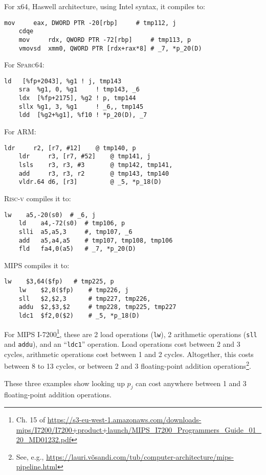 For x64, Haswell architecture, using Intel syntax, it compiles to:
\begin{lstlisting}[language={[x86]Assembler}]
    mov     eax, DWORD PTR -20[rbp]     # tmp112, j
    cdqe
    mov     rdx, QWORD PTR -72[rbp]     # tmp113, p
    vmovsd  xmm0, QWORD PTR [rdx+rax*8] # _7, *p_20(D)
\end{lstlisting}
For \textsc{Sparc64}:
\begin{lstlisting}[language={[sparc64]Assembler}]
    ld   [%fp+2043], %g1 ! j, tmp143
    sra  %g1, 0, %g1     ! tmp143, _6
    ldx  [%fp+2175], %g2 ! p, tmp144
    sllx %g1, 3, %g1     ! _6,, tmp145
    ldd  [%g2+%g1], %f10 ! *p_20(D), _7
\end{lstlisting}
For ARM:
\begin{lstlisting}[language={[ARM]Assembler}]
    ldr     r2, [r7, #12]    @ tmp140, p
    ldr     r3, [r7, #52]    @ tmp141, j
    lsls    r3, r3, #3       @ tmp142, tmp141,
    add     r3, r3, r2       @ tmp143, tmp140
    vldr.64 d6, [r3]         @ _5, *p_18(D)
\end{lstlisting}
\textsc{Risc-v} compiles it to:
\begin{lstlisting}[language={[RISC-V]Assembler}]
    lw    a5,-20(s0)  # _6, j
    ld    a4,-72(s0)  # tmp106, p
    slli  a5,a5,3     #, tmp107, _6
    add   a5,a4,a5    # tmp107, tmp108, tmp106
    fld   fa4,0(a5)   # _7, *p_20(D)
\end{lstlisting}
MIPS compiles it to:
\begin{lstlisting}[language={[mips]Assembler},
  keywordstyle={[3]\color{red!50!black}}]
    lw    $3,64($fp)   # tmp225, p
    lw    $2,8($fp)    # tmp226, j
    sll   $2,$2,3      # tmp227, tmp226,
    addu  $2,$3,$2     # tmp228, tmp225, tmp227
    ldc1  $f2,0($2)    # _5, *p_18(D)
\end{lstlisting}
For MIPS I-7200\footnote{Ch. 15 of \url{https://s3-eu-west-1.amazonaws.com/downloads-mips/I7200/I7200+product+launch/MIPS_I7200_Programmers_Guide_01_20_MD01232.pdf}},
these are 2 load operations (\texttt{lw}), 2 arithmetic operations
(\texttt{sll} and \texttt{addu}), and an ``\verb#ldc1#'' operation. Load
operations cost between 2 and 3 cycles, arithmetic operations cost
between 1 and 2 cycles. Altogether, this costs between 8 to 13 cycles,
or between 2 and 3 floating-point addition operations\footnote{See,
e.g., \url{https://lauri.võsandi.com/tub/computer-architecture/mips-pipeline.html}}.

These three examples show looking up $p_{j}$ can cost anywhere between 1
and 3 floating-point addition operations.

